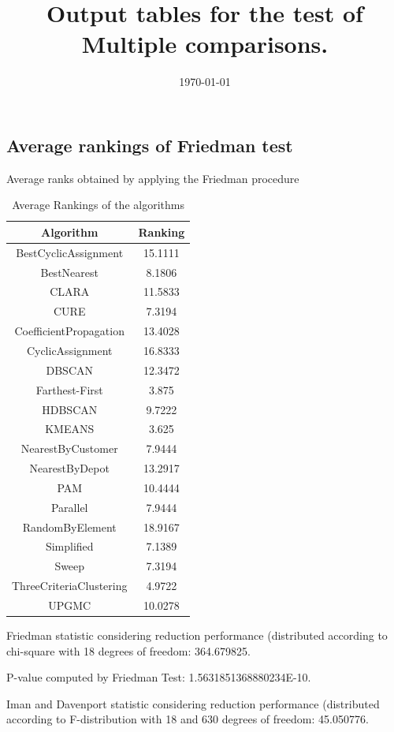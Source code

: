 \documentclass[a4paper,10pt]{article}
\title{Output tables for the test of Multiple comparisons.}
\author{}
\date{\today}
\begin{document}
\begin{landscape}
\pagestyle{empty}
\maketitle
\thispagestyle{empty}
\section{Average rankings of Friedman test}



Average ranks obtained by applying the Friedman procedure

\begin{table}[!htp]
\centering
\begin{tabular}{|c|c|}\hline
Algorithm&Ranking\\\hline
BestCyclicAssignment & 15.1111\\
BestNearest & 8.1806\\
CLARA & 11.5833\\
CURE & 7.3194\\
CoefficientPropagation & 13.4028\\
CyclicAssignment & 16.8333\\
DBSCAN & 12.3472\\
Farthest-First & 3.875\\
HDBSCAN & 9.7222\\
KMEANS & 3.625\\
NearestByCustomer & 7.9444\\
NearestByDepot & 13.2917\\
PAM & 10.4444\\
Parallel & 7.9444\\
RandomByElement & 18.9167\\
Simplified & 7.1389\\
Sweep & 7.3194\\
ThreeCriteriaClustering & 4.9722\\
UPGMC & 10.0278\\
\hline
\end{tabular}
\caption{Average Rankings of the algorithms}
\end{table}

Friedman statistic considering reduction performance (distributed according to chi-square with 18 degrees of freedom: 364.679825.

P-value computed by Friedman Test: 1.5631851368880234E-10.\newline

Iman and Davenport statistic considering reduction performance (distributed according to F-distribution with 18 and 630 degrees of freedom: 45.050776.


\end{landscape}
\end{document}
